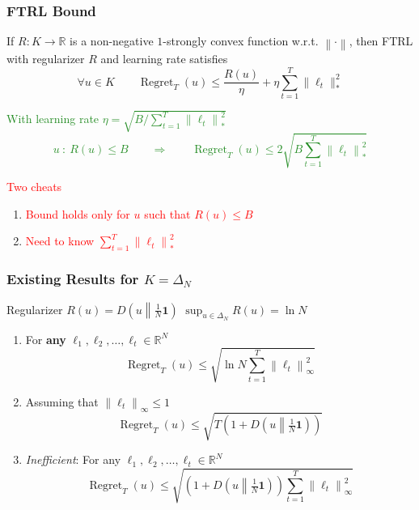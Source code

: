 \documentclass[usenames,dvipsnames]{beamer}
\DeclareMathOperator{\Regret}{Regret}
\newcommand{\R}{\mathbb{R}}
\newcommand{\indicator}{\mathbf{1}}
\newcommand{\norm}[1]{\left\|#1\right\|}
\newcommand{\KL}[2]{D\left({#1}\middle\|{#2}\right)}
\newcommand{\Cite}[1]{{\tiny \textcolor{Blue}{[#1]}}}
\begin{document}
\begin{frame}
\frametitle{FTRL Bound}

\begin{theorem}[\textcolor{Blue}{CBL'06, SS'11}]
If $R:K \to \R$ is a non-negative $1$-strongly convex function w.r.t. $\norm{\cdot}$, then FTRL
with regularizer $R$ and learning rate satisfies
$$
\forall u \in K \qquad  \Regret_T(u) \le \frac{R(u)}{\eta} + \eta \sum_{t=1}^T \|\ell_t\|_*^2
$$
\end{theorem}

\textcolor{ForestGreen}{
With learning rate $\eta = \sqrt{B/\sum_{t=1}^T \norm{\ell_t}_*^2}$
$$
u \ : \ R(u) \le B \qquad \Longrightarrow \qquad \Regret_T(u) \le 2 \sqrt{B \sum_{t=1}^T \norm{\ell_t}_*^2}
$$}

\textcolor{red}{Two cheats}
\begin{enumerate}
\item \textcolor{red}{Bound holds only for $u$ such that $R(u) \le B$}
\item \textcolor{red}{Need to know $\sum_{t=1}^T \norm{\ell_t}_*^2$}
\end{enumerate}

\end{frame}

\begin{frame}
\frametitle{Existing Results for $K=\Delta_N$}

Regularizer $R(u) = \KL{u}{\frac{1}{N} \indicator}$ \qquad $\sup_{u \in \Delta_N} R(u) = \ln N$

\vspace{0.5cm}

\begin{enumerate}

\item For \textbf{any} $\ell_1, \ell_2, \dots, \ell_t \in \R^N$ \qquad \Cite{deREGK'11, OP'15}
$$
\Regret_T(u) \le \sqrt{\ln N \sum_{t=1}^T \norm{\ell_t}_\infty^2}
$$

\item Assuming that $\norm{\ell_t}_\infty \le 1$ \qquad \Cite{CFH'09, CV'10, LS'14, LS'15, KE'15, FRS'15, OP'16}
$$
\Regret_T(u) \le \sqrt{T \left(1 + \KL{u}{\tfrac{1}{N}\indicator}\right)}
$$

\item \emph{Inefficient}: For any $\ell_1, \ell_2, \dots, \ell_t \in \R^N$ \qquad  \Cite{FRS'15+OP'16}
$$
\Regret_T(u) \le \sqrt{(1 + \KL{u}{\tfrac{1}{N}\indicator}) \sum_{t=1}^T \norm{\ell_t}_\infty^2}
$$
\end{enumerate}
\end{frame}
\end{document}
